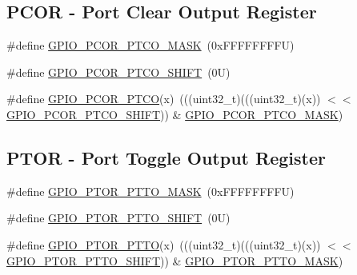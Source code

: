 \subsection*{P\+C\+OR -\/ Port Clear Output Register}
\begin{DoxyCompactItemize}
\item 
\#define \mbox{\hyperlink{group___g_p_i_o___register___masks_ga0b8378768ee61ea2c685a1687c90fa03}{G\+P\+I\+O\+\_\+\+P\+C\+O\+R\+\_\+\+P\+T\+C\+O\+\_\+\+M\+A\+SK}}~(0x\+F\+F\+F\+F\+F\+F\+F\+F\+U)
\item 
\#define \mbox{\hyperlink{group___g_p_i_o___register___masks_ga5c9203b830cbd86cd8d0189872b5c772}{G\+P\+I\+O\+\_\+\+P\+C\+O\+R\+\_\+\+P\+T\+C\+O\+\_\+\+S\+H\+I\+FT}}~(0\+U)
\item 
\#define \mbox{\hyperlink{group___g_p_i_o___register___masks_ga3a9c3710923cd50fc2df4e678180eb1d}{G\+P\+I\+O\+\_\+\+P\+C\+O\+R\+\_\+\+P\+T\+CO}}(x)~(((uint32\+\_\+t)(((uint32\+\_\+t)(x)) $<$$<$ \mbox{\hyperlink{group___g_p_i_o___register___masks_ga5c9203b830cbd86cd8d0189872b5c772}{G\+P\+I\+O\+\_\+\+P\+C\+O\+R\+\_\+\+P\+T\+C\+O\+\_\+\+S\+H\+I\+FT}})) \& \mbox{\hyperlink{group___g_p_i_o___register___masks_ga0b8378768ee61ea2c685a1687c90fa03}{G\+P\+I\+O\+\_\+\+P\+C\+O\+R\+\_\+\+P\+T\+C\+O\+\_\+\+M\+A\+SK}})
\end{DoxyCompactItemize}
\subsection*{P\+T\+OR -\/ Port Toggle Output Register}
\begin{DoxyCompactItemize}
\item 
\#define \mbox{\hyperlink{group___g_p_i_o___register___masks_gaa75953b5d9d23bdaa6c24232e1a52680}{G\+P\+I\+O\+\_\+\+P\+T\+O\+R\+\_\+\+P\+T\+T\+O\+\_\+\+M\+A\+SK}}~(0x\+F\+F\+F\+F\+F\+F\+F\+F\+U)
\item 
\#define \mbox{\hyperlink{group___g_p_i_o___register___masks_ga70e5442b3a119665aafb9e6e5b48bbd5}{G\+P\+I\+O\+\_\+\+P\+T\+O\+R\+\_\+\+P\+T\+T\+O\+\_\+\+S\+H\+I\+FT}}~(0\+U)
\item 
\#define \mbox{\hyperlink{group___g_p_i_o___register___masks_ga40757476c8889ca9d4cb7017b6c5ab60}{G\+P\+I\+O\+\_\+\+P\+T\+O\+R\+\_\+\+P\+T\+TO}}(x)~(((uint32\+\_\+t)(((uint32\+\_\+t)(x)) $<$$<$ \mbox{\hyperlink{group___g_p_i_o___register___masks_ga70e5442b3a119665aafb9e6e5b48bbd5}{G\+P\+I\+O\+\_\+\+P\+T\+O\+R\+\_\+\+P\+T\+T\+O\+\_\+\+S\+H\+I\+FT}})) \& \mbox{\hyperlink{group___g_p_i_o___register___masks_gaa75953b5d9d23bdaa6c24232e1a52680}{G\+P\+I\+O\+\_\+\+P\+T\+O\+R\+\_\+\+P\+T\+T\+O\+\_\+\+M\+A\+SK}})
\end{DoxyCompactItemize}
